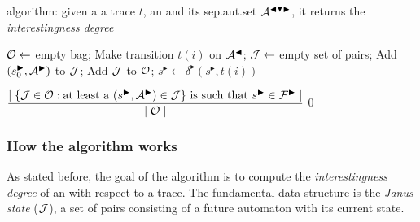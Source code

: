 \begin{algorithm}
	\caption{\janus algorithm: given a a trace $t$, an \rcon\xspace and its sep.aut.set $\mathcal{A}^{\blacktriangleleft \blacktriangledown \blacktriangleright}$, it returns the \textit{interestingness degree}}
	\label{alg:janus}
	\begin{algorithmic}[1]
		\State $\mathcal{O} \gets$ empty bag;
		\ForEach{$(\automaton^{\blacktriangleleft}, \automaton^{\blacktriangledown}, \automaton^{\blacktriangleright}) \in \automaton^{\blacktriangleleft \blacktriangledown \blacktriangleright}$} 
		\State Make transition $t(i)$ on $\mathcal{A}^\blacktriangleleft$;
		 \label{alg:activation}	
		\State $\mathcal{J} \gets$ empty set of pairs;				
		\State Add $(s_{0}^{\blacktriangleright}, \mathcal{A}^\blacktriangleright)$ to $\mathcal{J}$;
		\State Add $\mathcal{J}$ to $\mathcal{O}$;		
		\EndIf			
		\EndFor
		\ForEach{$\J \in \O$}
			 $s^{\blacktriangleright} \gets \delta^{\blacktriangleright}(s^{\blacktriangleright}, t(i)) $	
			\EndFor
		\EndFor
		\EndFor		

		\State \Return $\dfrac{\mid \{\mathcal{J} \in \mathcal{O}: \text{at least a } (s^{\blacktriangleright}, \mathcal{A}^\blacktriangleright) \in \mathcal{J} \} \text{ is such that } s^{\blacktriangleright} \in \mathcal{F}^{\blacktriangleright} \mid}{\mid \mathcal{O} \mid}$
		\Else
		\State \Return $0$
		\EndIf
		
	
	\end{algorithmic}
\end{algorithm}

\subsubsection*{How the algorithm works}
As stated before, the goal of the algorithm is to compute the \textit{interestingness degree} of an \rcon\xspace with respect to a trace. The fundamental data structure is the \textit{Janus state} ($\mathcal{J}$), a set of pairs consisting of a future automaton with its current state. 

